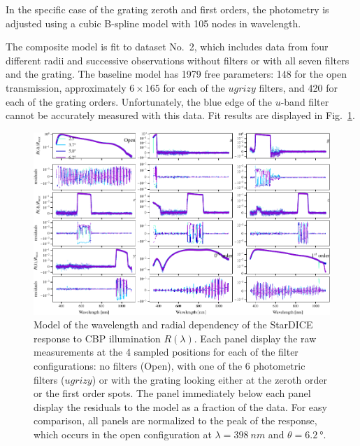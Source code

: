 In the specific case of the  grating zeroth and first orders, the photometry is
adjusted using a cubic B-spline model with \num{105} nodes in
wavelength.

The composite model is fit to dataset No.~2, which includes data
from four different radii and successive observations without filters
or with all seven filters and the grating. The baseline model has
\num{1979} free parameters: \num{148} for the open transmission,
approximately $6\times165$ for each of the $ugrizy$ filters, and
\num{420} for each of the grating orders. Unfortunately, the blue edge
of the $u$-band filter cannot be accurately measured with this
data. Fit results are displayed in
Fig.~\ref{fig:lambdathetafitresults}.

\begin{figure}
  \centering
  \includegraphics[width=1\linewidth]{./fig/lambdathetafitresults.pdf}
  \caption{Model of the wavelength and radial dependency of the
    StarDICE response to CBP illumination $R(\lambda)$. Each panel
    display the raw measurements at the 4 sampled positions for each of
    the filter configurations: no filters (Open), with one of the 6
    photometric filters ($ugrizy$) or with the grating looking either
    at the zeroth order or the first order spots. The panel
    immediately below each panel display the residuals to the
    model as a fraction of the data. For easy comparison, all panels are normalized to the peak
    of the response, which occurs in the open configuration at
    $\lambda = \SI{398}{nm}$ and $\theta = \SI{6.2}{\degree}$.
 }
  \label{fig:lambdathetafitresults}
\end{figure}


